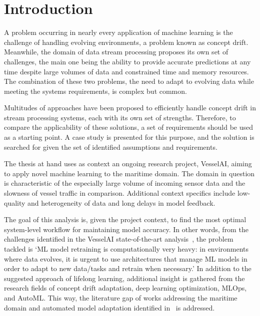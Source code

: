 \chapter{Introduction}
A problem occurring in nearly every application of machine learning is the challenge of handling evolving environments, a problem known as concept drift. Meanwhile, the domain of data stream processing proposes its own set of challenges, the main one being the ability to provide accurate predictions at any time despite large volumes of data and constrained time and memory resources. The combination of these two problems, the need to adapt to evolving data while meeting the systems requirements, is complex but common.

Multitudes of approaches have been proposed to efficiently handle concept drift in stream processing systems, each with its own set of strengths. Therefore, to compare the applicability of these solutions, a set of requirements should be used as a starting point. A case study is presented for this purpose, and the solution is searched for given the set of identified assumptions and requirements.

The thesis at hand uses as context an ongoing research project, VesselAI, aiming to apply novel machine learning to the maritime domain. The domain in question is characteristic of the especially large volume of incoming sensor data and the slowness of vessel traffic in comparison. Additional context specifics include low-quality and heterogeneity of data and long delays in model feedback. 

The goal of this analysis is, given the project context, to find the most optimal system-level workflow for maintaining model accuracy. In other words, from the challenges identified in the VesselAI state-of-the-art analysis~\cite{D1.1}, the problem tackled is ‘ML model retraining is computationally very heavy: in environments where data evolves, it is urgent to use architectures that manage ML models in order to adapt to new data/tasks and retrain when necessary.' In addition to the suggested approach of lifelong learning, additional insight is gathered from the research fields of concept drift adaptation, deep learning optimization, MLOps, and AutoML. This way, the literature gap of works addressing the maritime domain and automated model adaptation identified in~\cite{D1.1} is addressed.

